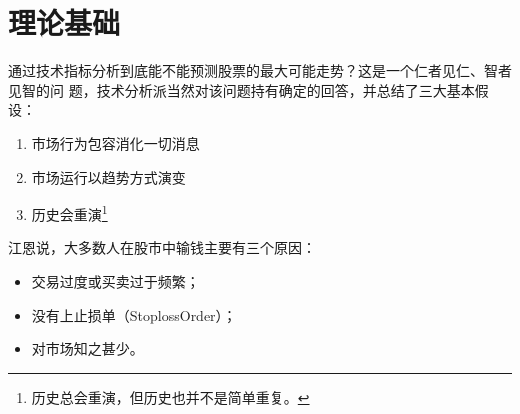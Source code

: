 \chapter{理论基础}


通过技术指标分析到底能不能预测股票的最大可能走势？这是一个仁者见仁、智者见智的问
题，技术分析派当然对该问题持有确定的回答，并总结了三大基本假设：

\begin{enumerate}
    \item 市场行为包容消化一切消息
    \item 市场运行以趋势方式演变
    \item 历史会重演\footnote{历史总会重演，但历史也并不是简单重复。}
\end{enumerate}


江恩说，大多数人在股市中输钱主要有三个原因：

\begin{itemize}
  \item 交易过度或买卖过于频繁；
  \item 没有上止损单（StoplossOrder）；
  \item 对市场知之甚少。
\end{itemize}
